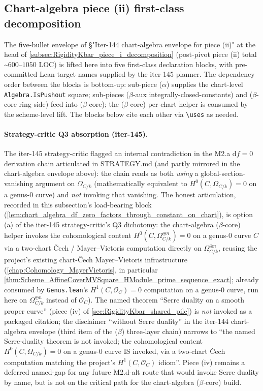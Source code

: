 \subsection{Chart-algebra piece (ii) first-class decomposition}
\label{subsec:RigidityKbar_piece_ii_chart_algebra_decomposition}

The five-bullet envelope of \S "Iter-144 chart-algebra envelope for piece (ii)" at the head of \cref{subsec:RigidityKbar_piece_i_decomposition} (post-pivot piece (ii) total \textasciitilde\(600\)--\(1050\) LOC) is lifted here into five first-class declaration blocks, with pre-committed Lean target names supplied by the iter-145 planner. The dependency order between the blocks is bottom-up: sub-piece (\(\alpha\)) supplies the chart-level \texttt{Algebra.IsPushout} square; sub-pieces (\(\beta\)-aux integrally-closed-constants) and (\(\beta\)-core ring-side) feed into (\(\beta\)-core); the (\(\beta\)-core) per-chart helper is consumed by the scheme-level lift. The blocks below cite each other via \texttt{\textbackslash uses} as needed.

\paragraph{Strategy-critic Q3 absorption (iter-145).} The iter-145 strategy-critic flagged an internal contradiction in the M2.a \(\mathrm df = 0\) derivation chain articulated in STRATEGY.md (and partly mirrored in the chart-algebra envelope above): the chain reads as both \emph{using} a global-section-vanishing argument on \(\Omega_{C/k}\) (mathematically equivalent to \(H^0(C, \Omega_{C/k}) = 0\) on a genus-\(0\) curve) and \emph{not} invoking that vanishing. The honest articulation, recorded in this subsection's load-bearing block (\cref{lem:chart_algebra_df_zero_factors_through_constant_on_chart}), is option (a) of the iter-145 strategy-critic's Q3 dichotomy: the chart-algebra (\(\beta\)-core) helper invokes the cohomological content \(H^0(C, \Omega_{C/k}^{\oplus n}) = 0\) on a genus-\(0\) curve \(C\) via a two-chart \v Cech / Mayer--Vietoris computation directly on \(\Omega_{C/k}^{\oplus n}\), reusing the project's existing chart-\v Cech Mayer--Vietoris infrastructure (\cref{chap:Cohomology_MayerVietoris}, in particular \cref{thm:Scheme_AffineCoverMVSquare_HModule_prime_sequence_exact}; already consumed by \texttt{Genus.lean}'s \(H^1(C, \mathcal O_C) = 0\) computation on a genus-\(0\) curve, run here on \(\Omega_{C/k}^{\oplus n}\) instead of \(\mathcal O_C\)). The named theorem ``Serre duality on a smooth proper curve'' (piece (iv) of \cref{sec:RigidityKbar_shared_pile}) is \emph{not} invoked as a packaged citation; the disclaimer ``without Serre duality'' in the iter-144 chart-algebra envelope (third item of the (\(\beta\)) three-layer chain) narrows to ``the named Serre-duality theorem is not invoked; the cohomological content \(H^0(C, \Omega_{C/k}) = 0\) on a genus-\(0\) curve IS invoked, via a two-chart \v Cech computation matching the project's \(H^1(C, \mathcal O_C)\) idiom''. Piece (iv) remains a deferred named-gap for any future M2.d-alt route that would invoke Serre duality by name, but is not on the critical path for the chart-algebra (\(\beta\)-core) build.


